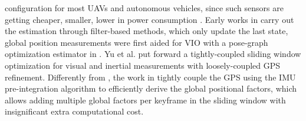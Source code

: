 \documentclass[journal,article,submit,moreauthors,pdftex]{Definitions/mdpi}
\begin{document}
configuration for most UAVs and autonomous vehicles, since such 
sensors are getting cheaper, smaller, lower in power consumption \cite{chiangPerformanceAnalysisINS2020a}. 
Early works in \cite{shunsukeGNSSINSOnboard2015,sahmoudiAnalysisNavigationSystem2016,kimTightlycoupledIntegrationGPS2016,adeelResearchPerformanceAnalysis2017,leeIntermittentGPSaidedVIO} 
carry out the estimation through filter-based methods, which only 
update the last state, global position measurements were first aided 
for VIO with a pose-graph optimization estimator in \cite{mascaroGOMSFGraphOptimizationBased2018}. 
Yu et al. \cite{yuGPSaidedOmnidirectionalVisualInertial2019} put 
forward a tightly-coupled sliding window optimization for visual and 
inertial measurements with loosely-coupled GPS refinement. 
Differently from \cite{yuGPSaidedOmnidirectionalVisualInertial2019}, 
the work in \cite{cioffiTightlycoupledFusionGlobal2020} tightly 
couple the GPS using the IMU pre-integration algorithm to 
efficiently derive the global positional factors, which allows 
adding multiple global factors per keyframe in the sliding window 
with insignificant extra computational cost. 
\end{document}
